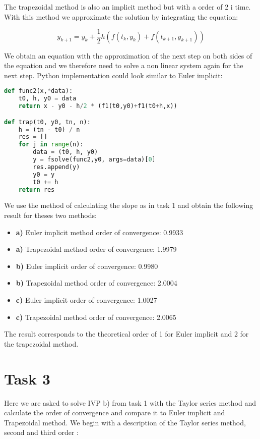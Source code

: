 \documentclass[a4paper]{article}
\begin{document}
The trapezoidal method is also an implicit method but with a order of 2 i time. With this method we approximate the solution by integrating the equation: 

\begin{equation}
 y_{k+1} = y_k + \frac{1} {2}h(f(t_k,y_k)+f(t_{k+1},y_{k+1})) 
 \end{equation} 

We obtain an equation with the approximation of the next step on both sides of the equation and we therefore need to solve a non linear system again for the next step. Python implementation could look similar to Euler implicit: 

\begin{lstlisting}[language=Python]
def func2(x,*data):
    t0, h, y0 = data
    return x - y0 - h/2 * (f1(t0,y0)+f1(t0+h,x))

def trap(t0, y0, tn, n):
    h = (tn - t0) / n
    res = []
    for j in range(n):
        data = (t0, h, y0)
        y = fsolve(func2,y0, args=data)[0]
        res.append(y)
        y0 = y
        t0 += h
    return res
\end{lstlisting}

\newpage

We use the method of calculating the slope as in task 1 and obtain the following result for theses two methods:

\begin{itemize}
	\item \textbf{a)} Euler implicit method order of convergence:  0.9933
	 \item \textbf{a)} Trapezoidal method order of convergence:  1.9979
	 \item \textbf{b)} Euler implicit order of convergence:  0.9980
	 \item \textbf{b)} Trapezoidal method order of convergence:  2.0004
	 \item \textbf{c)} Euler implicit order of convergence:  1.0027
	 \item \textbf{c)} Trapezoidal method order of convergence:  2.0065
\end{itemize}

The result corresponds to the theoretical order of 1 for Euler implicit and 2 for the trapezoidal method. 

\section*{Task 3}
Here we are asked to solve IVP b) from task 1 with the Taylor series method and calculate the order of convergence and compare it to Euler implicit and Trapezoidal method. We begin with a description of the Taylor series method, second and third order \citep{taylor}:
\end{document}
